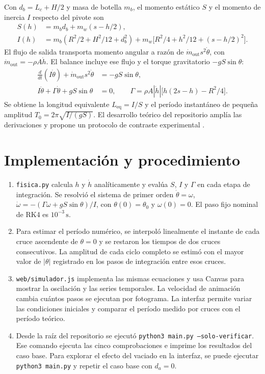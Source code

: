 \documentclass[11pt,a4paper]{article}
\begin{document}
Con \(d_b=L_c+H/2\) y masa de botella \(m_b\), el momento estático \(S\)
y el momento de inercia \(I\) respecto del pivote son
\begin{align*}
 S(h) &= m_b d_b + m_w(s-h/2),\\
 I(h) &= m_b(R^2/2+H^2/12+d_b^2)
       +m_w\big[R^2/4+h^2/12+(s-h/2)^2\big].
\end{align*}
El flujo de salida transporta momento angular a razón de
\(\dot m_{\mathrm{out}}s^2\dot\theta\), con
\(\dot m_{\mathrm{out}}=-\rho A\dot h\). El balance incluye ese flujo y el
torque gravitatorio \(-gS\sin\theta\):
\begin{align*}
 \frac{d}{dt}(I\dot\theta)+\dot m_{\mathrm{out}}s^2\dot\theta
      &= -gS\sin\theta,\\
 I\ddot\theta+\Gamma\dot\theta+gS\sin\theta &= 0,\qquad
 \Gamma=\rho A|\dot h|\big[h(2s-h)-R^2/4\big].
\end{align*}
Se obtiene la longitud equivalente \(L_{\mathrm{eq}}=I/S\) y el período
instantáneo de pequeña amplitud \(T_0=2\pi\sqrt{I/(gS)}\). El desarrollo
teórico del repositorio amplía las derivaciones y propone un protocolo
de contraste experimental \cite{teoria}.

\section{Implementación y procedimiento}
\begin{enumerate}
\item \texttt{fisica.py} calcula \(h\) y \(\dot h\) analíticamente y
evalúa \(S\), \(I\) y \(\Gamma\) en cada etapa de integración. Se resolvió
el sistema de primer orden \(\dot\theta=\omega\),
\(\dot\omega=-(\Gamma\omega+gS\sin\theta)/I\), con
\(\theta(0)=\theta_0\) y \(\omega(0)=0\). El paso fijo nominal de RK4 es
\(10^{-3}\,\mathrm{s}\).

\item Para estimar el período numérico, se interpoló linealmente el
instante de cada cruce ascendente de \(\theta=0\) y se restaron los
tiempos de dos cruces consecutivos. La amplitud de cada ciclo completo
se estimó con el mayor valor de \(|\theta|\) registrado en los pasos de
integración entre esos cruces.

\item \texttt{web/simulador.js} implementa las mismas ecuaciones y usa
Canvas para mostrar la oscilación y las series temporales. La velocidad
de animación cambia cuántos pasos se ejecutan por fotograma. La interfaz
permite variar las condiciones iniciales y comparar el período medido
por cruces con el período teórico.

\item Desde la raíz del repositorio se ejecutó
\texttt{python3 main.py --solo-verificar}. Ese comando ejecuta las cinco
comprobaciones e imprime los resultados del caso base. Para explorar el
efecto del vaciado en la interfaz, se puede ejecutar
\texttt{python3 main.py} y repetir el caso base con \(d_a=0\).
\end{enumerate}
\end{document}
